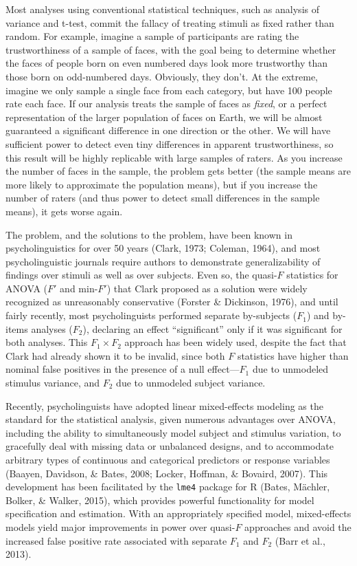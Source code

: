 \documentclass[
  english,
  doc,floatsintext]{apa6}
\begin{document}
Most analyses using conventional statistical techniques, such as analysis of variance and t-test, commit the fallacy of treating stimuli as fixed rather than random. For example, imagine a sample of participants are rating the trustworthiness of a sample of faces, with the goal being to determine whether the faces of people born on even numbered days look more trustworthy than those born on odd-numbered days. Obviously, they don't. At the extreme, imagine we only sample a single face from each category, but have 100 people rate each face. If our analysis treats the sample of faces as \emph{fixed}, or a perfect representation of the larger population of faces on Earth, we will be almost guaranteed a significant difference in one direction or the other. We will have sufficient power to detect even tiny differences in apparent trustworthiness, so this result will be highly replicable with large samples of raters. As you increase the number of faces in the sample, the problem gets better (the sample means are more likely to approximate the population means), but if you increase the number of raters (and thus power to detect small differences in the sample means), it gets worse again.

The problem, and the solutions to the problem, have been known in psycholinguistics for over 50 years (Clark, 1973; Coleman, 1964), and most psycholinguistic journals require authors to demonstrate generalizability of findings over stimuli as well as over subjects. Even so, the quasi-\(F\) statistics for ANOVA (\(F'\) and min-\(F'\)) that Clark proposed as a solution were widely recognized as unreasonably conservative (Forster \& Dickinson, 1976), and until fairly recently, most psycholinguists performed separate by-subjects (\(F_1\)) and by-items analyses (\(F_2\)), declaring an effect \enquote{significant} only if it was significant for both analyses. This \(F_1 \times F_2\) approach has been widely used, despite the fact that Clark had already shown it to be invalid, since both \(F\) statistics have higher than nominal false positives in the presence of a null effect---\(F_1\) due to unmodeled stimulus variance, and \(F_2\) due to unmodeled subject variance.

Recently, psycholinguists have adopted linear mixed-effects modeling as the standard for the statistical analysis, given numerous advantages over ANOVA, including the ability to simultaneously model subject and stimulus variation, to gracefully deal with missing data or unbalanced designs, and to accommodate arbitrary types of continuous and categorical predictors or response variables (Baayen, Davidson, \& Bates, 2008; Locker, Hoffman, \& Bovaird, 2007). This development has been facilitated by the \texttt{lme4} package for R (Bates, Mächler, Bolker, \& Walker, 2015), which provides powerful functionality for model specification and estimation. With an appropriately specified model, mixed-effects models yield major improvements in power over quasi-\(F\) approaches and avoid the increased false positive rate associated with separate \(F_1\) and \(F_2\) (Barr et al., 2013).
\end{document}
